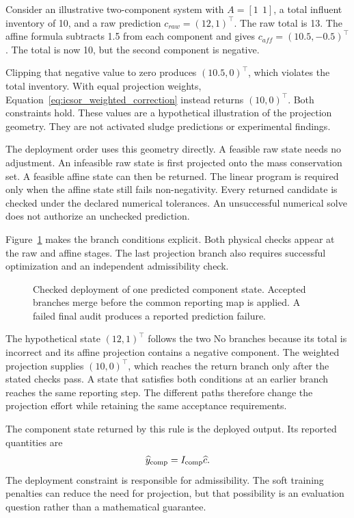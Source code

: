 Consider an illustrative two-component system with \(A=[1\ \ 1]\), a total influent inventory of 10, and a raw prediction \(c_{raw}=(12,1)^\top\). The raw total is 13. The affine formula subtracts 1.5 from each component and gives \(c_{aff}=(10.5,-0.5)^\top\). The total is now 10, but the second component is negative.

Clipping that negative value to zero produces \((10.5,0)^\top\), which violates the total inventory. With equal projection weights, Equation~\eqref{eq:icsor_weighted_correction} instead returns \((10,0)^\top\). Both constraints hold. These values are a hypothetical illustration of the projection geometry. They are not activated sludge predictions or experimental findings.

The deployment order uses this geometry directly. A feasible raw state needs no adjustment. An infeasible raw state is first projected onto the mass conservation set. A feasible affine state can then be returned. The linear program is required only when the affine state still fails non-negativity. Every returned candidate is checked under the declared numerical tolerances. An unsuccessful numerical solve does not authorize an unchecked prediction.

Figure~\ref{fig:ch5_checked_deployment} makes the branch conditions explicit. Both physical checks appear at the raw and affine stages. The last projection branch also requires successful optimization and an independent admissibility check.

\begin{figure}[htbp]
\centering

\caption{Checked deployment of one predicted component state. Accepted branches merge before the common reporting map is applied. A failed final audit produces a reported prediction failure.}
\label{fig:ch5_checked_deployment}
\end{figure}

The hypothetical state \((12,1)^\top\) follows the two No branches because its total is incorrect and its affine projection contains a negative component. The weighted projection supplies \((10,0)^\top\), which reaches the return branch only after the stated checks pass. A state that satisfies both conditions at an earlier branch reaches the same reporting step. The different paths therefore change the projection effort while retaining the same acceptance requirements.

The component state returned by this rule is the deployed output. Its reported quantities are
\begin{equation}
\equationname{Water-quality composites of the final checked state}
\label{eq:icsor_deployed_composites}
\widehat y_{\mathrm{comp}}=I_{\mathrm{comp}}\widehat c.
\end{equation}
The deployment constraint is responsible for admissibility. The soft training penalties can reduce the need for projection, but that possibility is an evaluation question rather than a mathematical guarantee.

